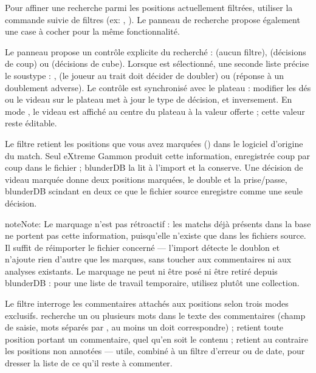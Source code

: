 \documentclass[letterpaper,10pt,french]{sphinxmanual}
\begin{document}
\sphinxAtStartPar
Pour affiner une recherche parmi les positions actuellement filtrées, utiliser
la commande  suivie de filtres (ex: , ). Le panneau
de recherche propose également une case à cocher 
pour la même fonctionnalité.

\sphinxAtStartPar
Le panneau propose un contrôle explicite du  recherché :
 (aucun filtre),  (décisions de coup) ou 
(décisions de cube). Lorsque  est sélectionné, une seconde liste précise
le sous\sphinxhyphen{}type : ,  (le joueur au trait doit décider
de doubler) ou  (réponse à un doublement adverse). Le contrôle est
synchronisé avec le plateau : modifier les dés ou le videau sur le plateau met à
jour le type de décision, et inversement. En mode , le videau est
affiché au centre du plateau à la valeur offerte ; cette valeur reste éditable.

\sphinxAtStartPar
Le filtre  retient les positions que vous avez marquées () dans
le logiciel d’origine du match. Seul eXtreme Gammon produit cette information,
enregistrée coup par coup dans le fichier  ; blunderDB la lit à l’import
et la conserve. Une décision de videau marquée donne deux positions marquées, le
double et la prise/passe, blunderDB scindant en deux ce que le fichier source
enregistre comme une seule décision.

\begin{sphinxadmonition}{note}{Note:}
\sphinxAtStartPar
Le marquage n’est pas rétroactif : les matchs déjà présents dans la
base ne portent pas cette information, puisqu’elle n’existe que dans les
fichiers source. Il suffit de réimporter le fichier  concerné —
l’import détecte le doublon et n’ajoute rien d’autre que les marques, sans
toucher aux commentaires ni aux analyses existants. Le marquage ne peut ni
être posé ni être retiré depuis blunderDB : pour une liste de travail
temporaire, utilisez plutôt une collection.
\end{sphinxadmonition}

\sphinxAtStartPar
Le filtre  interroge les commentaires attachés aux positions
selon trois modes exclusifs.  recherche un ou plusieurs mots
dans le texte des commentaires (champ de saisie, mots séparés par \sphinxcode{\sphinxupquote{;}}, au
moins un doit correspondre) ;  retient toute position portant
un commentaire, quel qu’en soit le contenu ;  retient au
contraire les positions non annotées — utile, combiné à un filtre d’erreur ou de
date, pour dresser la liste de ce qu’il reste à commenter.
\end{document}
